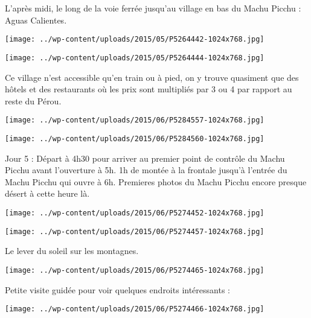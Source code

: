  \newline
 L'après midi, le long de la voie ferrée jusqu'au village en bas du Machu Picchu : Aguas Calientes. \newline
 \newline
\centerline{\texttt{[image: ../wp-content/uploads/2015/05/P5264442-1024x768.jpg]} } 
 \newline
 \newline
\centerline{\texttt{[image: ../wp-content/uploads/2015/05/P5264444-1024x768.jpg]} } 
 \newline
 Ce village n'est accessible qu'en train ou à pied, on y trouve quasiment que des hôtels et des restaurants où les prix sont multipliés par 3 ou 4 par rapport au reste du Pérou. \newline
 \newline
\centerline{\texttt{[image: ../wp-content/uploads/2015/06/P5284557-1024x768.jpg]} } 
 \newline
 \newline
\centerline{\texttt{[image: ../wp-content/uploads/2015/06/P5284560-1024x768.jpg]} } 
 \newline
 Jour 5 : \newline
 Départ à 4h30 pour arriver au premier point de contrôle du Machu Picchu avant l'ouverture à 5h. \newline
 1h de montée à la frontale jusqu'à l'entrée du Machu Picchu qui ouvre à 6h. \newline
 Premieres photos du Machu Picchu encore presque désert à cette heure là. \newline
 \newline
\centerline{\texttt{[image: ../wp-content/uploads/2015/06/P5274452-1024x768.jpg]} } 
 \newline
 \newline
\centerline{\texttt{[image: ../wp-content/uploads/2015/06/P5274457-1024x768.jpg]} } 
 \newline
 Le lever du soleil sur les montagnes. \newline
 \newline
\centerline{\texttt{[image: ../wp-content/uploads/2015/06/P5274465-1024x768.jpg]} } 
 \newline
 Petite visite guidée pour voir quelques endroits intéressants : \newline
 \newline
\centerline{\texttt{[image: ../wp-content/uploads/2015/06/P5274466-1024x768.jpg]} } 
